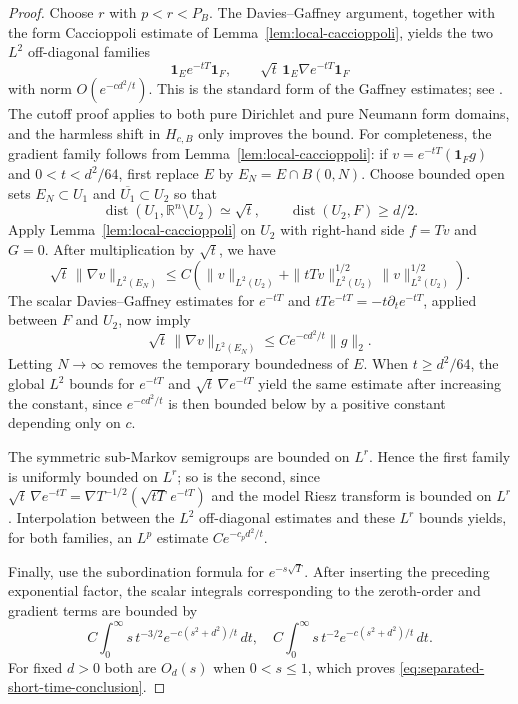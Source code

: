 \documentclass[12pt]{amsart}
\newcommand\R{\mathbb{R}}
\newcommand{\dist}{\operatorname{dist}}
\theoremstyle{remark}
\begin{document}
\begin{proof}
Choose \(r\) with \(p<r<P_B\).  The Davies--Gaffney argument, together
with the form Caccioppoli estimate of Lemma~\ref{lem:local-caccioppoli},
yields the two \(L^2\) off-diagonal families
\[
 \mathbf 1_Ee^{-tT}\mathbf 1_F,\qquad
 \sqrt t\,\mathbf 1_E\nabla e^{-tT}\mathbf 1_F
\]
with norm \(O(e^{-c d^2/t})\).  This is the standard form of the
Gaffney estimates; see \cite[\S3.1, in particular (3.1)]{ACDH04}.
The cutoff proof applies to both pure Dirichlet and pure Neumann form
domains, and the harmless shift in \(H_{c,B}\) only improves the bound.
For completeness, the gradient family follows from
Lemma~\ref{lem:local-caccioppoli}: if
\(v=e^{-tT}(\mathbf1_Fg)\) and \(0<t<d^2/64\), first replace $E$ by
$E_N=E\cap B(0,N)$.  Choose bounded open sets
$E_N\subset U_1$ and $\overline{U_1}\subset U_2$ so that
\[
 \dist(U_1,\R^n\setminus U_2)\simeq\sqrt t,
 \qquad \dist(U_2,F)\ge d/2.
\]
Apply Lemma~\ref{lem:local-caccioppoli} on $U_2$ with right-hand side
$f=Tv$ and $G=0$.  After multiplication by $\sqrt t$, we have
\[
 \sqrt t\,\|\nabla v\|_{L^2(E_N)}
 \le C\left(
 \|v\|_{L^2(U_2)}
 +\|tTv\|_{L^2(U_2)}^{1/2}\|v\|_{L^2(U_2)}^{1/2}
 \right).
\]
The scalar Davies--Gaffney estimates for $e^{-tT}$ and
$tTe^{-tT}=-t\partial_te^{-tT}$, applied between $F$ and $U_2$, now imply
\[
 \sqrt t\,\|\nabla v\|_{L^2(E_N)}
 \le Ce^{-cd^2/t}\|g\|_2.
\]
Letting $N\to\infty$ removes the temporary boundedness of $E$.  When
$t\ge d^2/64$, the global $L^2$ bounds for $e^{-tT}$ and
$\sqrt t\,\nabla e^{-tT}$ yield the same estimate after increasing the
constant, since $e^{-cd^2/t}$ is then bounded below by a positive
constant depending only on $c$.

The symmetric sub-Markov semigroups are bounded on \(L^r\).  Hence the
first family is uniformly bounded on \(L^r\); so is the second, since $\sqrt t\,\nabla e^{-tT}
 =\nabla T^{-1/2}(\sqrt{tT}\,e^{-tT})$
and the model Riesz transform is bounded on \(L^r\).  Interpolation between
the \(L^2\) off-diagonal estimates and these \(L^r\) bounds yields, for
both families, an \(L^p\) estimate
\(C e^{-c_p d^2/t}\).

Finally, use the subordination formula for \(e^{-s\sqrt T}\).
After inserting the preceding exponential factor, the scalar integrals
corresponding to the zeroth-order and gradient terms are bounded by
\[
 C\!\int_0^\infty s\,t^{-3/2}e^{-c(s^2+d^2)/t}\,dt,\quad
 C\!\int_0^\infty s\,t^{-2}e^{-c(s^2+d^2)/t}\,dt .
\]
For fixed \(d>0\) both are \(O_d(s)\) when \(0<s\le1\), which proves
\eqref{eq:separated-short-time-conclusion}.
\end{proof}
\end{document}
